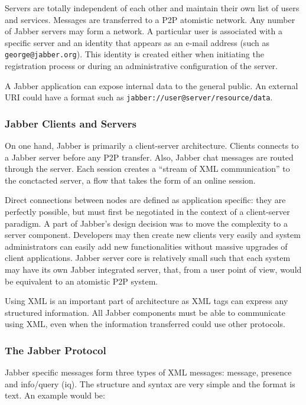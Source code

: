 Servers are totally independent of each other and maintain their own list of
users and services. Messages are transferred to a P2P atomistic network. Any
number of Jabber servers may form a network. A particular user is associated
with a specific server and an identity that appears as an e-mail address
(such as \texttt{george@jabber.org}). This identity is created either when
initiating the registration process or during an administrative configuration
of the server.

A Jabber application can expose internal data to the general public. An
external URI could have a format such as
\texttt{jabber://user@server/resource/data}.

\subsubsection{Jabber Clients and Servers}

On one hand, Jabber is primarily a client-server architecture. Clients
connects to a Jabber server before any P2P transfer. Also, Jabber chat
messages are routed through the server. Each session creates a ``stream of XML
communication'' to the conctacted server, a flow that takes the form of an
online session.

Direct connections between nodes are defined as application specific: they are
perfectly possible, but must first be negotiated in the context of
a client-server paradigm. A part of Jabber's design decision was to move the
complexity to a server component. Developers may then create new clients very
easily and system administrators can easily add new functionalities without
massive upgrades of client applications. Jabber server core is relatively
small such that each system may have its own Jabber integrated server, that,
from a user point of view, would be equivalent to an atomistic P2P system.

Using XML is an important part of architecture as XML tags can express any
structured information. All Jabber components must be able to communicate using
XML, even when the information transferred could use other protocols.

\subsubsection{The Jabber Protocol}

Jabber specific messages form three types of XML messages: message, presence
and info/query (iq). The structure and syntax are very simple and the format is
text. An example would be:

